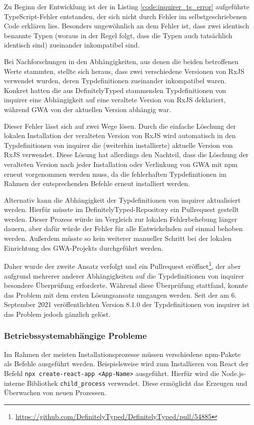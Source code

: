 Zu Beginn der Entwicklung ist der in Listing \ref{code:inquirer_ts_error} aufgeführte TypeScript-Fehler entstanden, der sich nicht durch Fehler im selbstgeschriebenen Code erklären lies. Besonders ungewöhnlich an dem Fehler ist, dass zwei identisch benannte Typen (woraus in der Regel folgt, dass die Typen auch tatsächlich identisch sind) zueinander inkompatibel sind.

Bei Nachforschungen in den Abhängigkeiten, aus denen die beiden betroffenen Werte stammten, stellte sich heraus, dass zwei verschiedene Versionen von RxJS verwendet wurden, deren Typdefinitionen zueinander inkompatibel waren. Konkret hatten die aus DefinitelyTyped stammenden Typdefinitionen von inquirer eine Abhängigkeit auf eine veraltete Version von RxJS deklariert, während \gls{GWA} von der aktuellen Version abhängig war.

Dieser Fehler lässt sich auf zwei Wege lösen. Durch die einfache Löschung der lokalen Installation der veralteten Version von RxJS wird automatisch in den Typdefinitionen von inquirer die (weiterhin installierte) aktuelle Version von RxJS verwendet. Diese Lösung hat allerdings den Nachteil, dass die Löschung der veralteten Version nach jeder Installation oder Verlinkung von \gls{GWA} mit \gls{npm} erneut vorgenommen werden muss, da die fehlerhaften Typdefinitionen im Rahmen der entsprechenden Befehle erneut installiert werden.

Alternativ kann die Abhängigkeit der Typdefinitionen von inquirer aktualisiert werden. Hierfür müsste im DefinitelyTyped-Repository ein Pullrequest gestellt werden. Dieser Prozess würde im Vergleich zur lokalen Fehlerbehebung länger dauern, aber dafür würde der Fehler für alle Entwickelnden auf einmal behoben werden. Außerdem müsste so kein weiterer manueller Schritt bei der lokalen Einrichtung des \gls{GWA}-Projekts durchgeführt werden.

Daher wurde der zweite Ansatz verfolgt und ein Pullrequest eröffnet\footnote{\url{https://github.com/DefinitelyTyped/DefinitelyTyped/pull/54885}}, der aber aufgrund mehrerer anderer Abhängigkeiten auf die Typdefinitionen von inquirer besondere Überprüfung erforderte. Während diese Überprüfung stattfand, konnte das Problem mit dem ersten Lösungsansatz umgangen werden. Seit der am 6. September 2021 veröffentlichten Version 8.1.0 der Typdefinitionen von inquirer ist das Problem jedoch gänzlich gelöst.

\subsubsection{Betriebssystemabhängige Probleme}
Im Rahmen der meisten Installationsprozesse müssen verschiedene \gls{npm}-Pakete als Befehle ausgeführt werden. Beispielsweise wird zum Installieren von React der Befehl \verb/npx create-react-app <App-Name>/ ausgeführt. Hierfür wird die Node.js-interne Bibliothek \verb/child_process/ verwendet. Diese ermöglicht das Erzeugen und Überwachen von neuen Prozessen.

